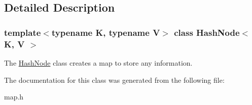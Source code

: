 \subsection{Detailed Description}
\subsubsection*{template$<$typename K, typename V$>$\newline
class Hash\+Node$<$ K, V $>$}

The \hyperlink{class_hash_node}{Hash\+Node} class creates a map to store any information. 

The documentation for this class was generated from the following file\+:\begin{DoxyCompactItemize}
\item 
map.\+h\end{DoxyCompactItemize}
